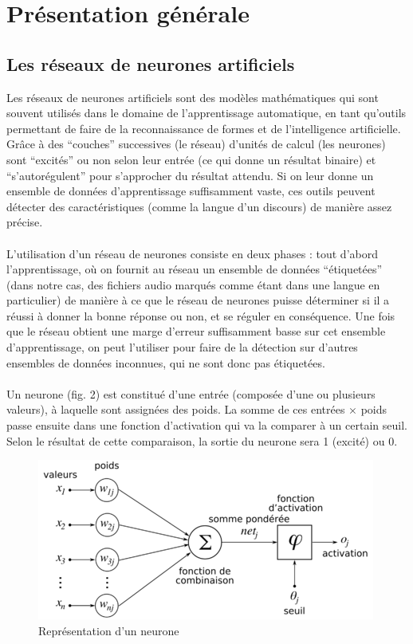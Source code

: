 \documentclass{article}
\begin{document}
\section{Présentation générale}

\subsection{Les réseaux de neurones artificiels}

Les réseaux de neurones artificiels sont des modèles mathématiques qui sont souvent utilisés dans le domaine de l'apprentissage automatique, en tant qu'outils permettant de faire de la reconnaissance de formes et de l'intelligence artificielle. Grâce à des ``couches'' successives (le réseau) d'unités de calcul (les neurones) sont ``excités'' ou non selon leur entrée (ce qui donne un résultat binaire) et ``s'autorégulent'' pour s'approcher du résultat attendu. Si on leur donne un ensemble de données d'apprentissage suffisamment vaste, ces outils peuvent détecter des caractéristiques (comme la langue d'un discours) de manière assez précise.\\
\\
L'utilisation d'un réseau de neurones consiste en deux phases : tout d'abord l'apprentissage, où on fournit au réseau un ensemble de données ``étiquetées'' (dans notre cas, des fichiers audio marqués comme étant dans une langue en particulier) de manière à ce que le réseau de neurones puisse déterminer si il a réussi à donner la bonne réponse ou non, et se réguler en conséquence. Une fois que le réseau obtient une marge d'erreur suffisamment basse sur cet ensemble d'apprentissage, on peut l'utiliser pour faire de la détection sur d'autres ensembles de données inconnues, qui ne sont donc pas étiquetées.\\
\\
Un neurone (fig. 2) est constitué d'une entrée (composée d'une ou plusieurs valeurs), à laquelle sont assignées des poids. La somme de ces entrées $\times$ poids passe ensuite dans une fonction d'activation qui va la comparer à un certain seuil. Selon le résultat de cette comparaison, la sortie du neurone sera 1 (excité) ou 0.\\

\begin{figure}[h]
  \centerline{\includegraphics[scale=0.6]{img/neurone.png}}
  \caption{Représentation d'un neurone}
\end{figure}
\end{document}
